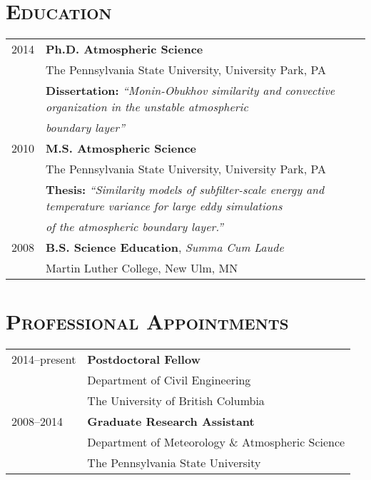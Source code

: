 \documentclass[11pt,letterpaper]{article}
\begin{document}
\section*{\textsc{Education}}
\begin{tabular}{l l}
2014 & \textbf{Ph.D. Atmospheric Science} \\
      & The Pennsylvania State University, University Park, PA \\
      & {\small \textbf{Dissertation:}} \textit{\small``Monin-Obukhov similarity and convective organization in the unstable atmospheric}\\
      & \textit{\small boundary layer''} \\[1.5\parskip]

2010 & \textbf{M.S. Atmospheric Science} \\
      & The Pennsylvania State University, University Park, PA \\
      & {\small \textbf{Thesis:}} \textit{\small ``Similarity models of subfilter-scale energy and temperature variance for large eddy simulations} \\
      & \textit{\small of the atmospheric boundary layer.''} \\[1.5\parskip]

2008 & \textbf{B.S. Science Education}, \textit{Summa Cum Laude} \\
              & Martin Luther College, New Ulm, MN
\end{tabular}

\section*{\textsc{Professional Appointments}} 

\begin{tabular}{l l}
2014--present & \textbf{Postdoctoral Fellow} \\ & Department of Civil Engineering \\
              & The University of British Columbia \\[1.5\parskip]
2008--2014 & \textbf{Graduate Research Assistant} \\ & Department of Meteorology \& Atmospheric Science\\
                 & The Pennsylvania State University
\end{tabular}
\end{document}
